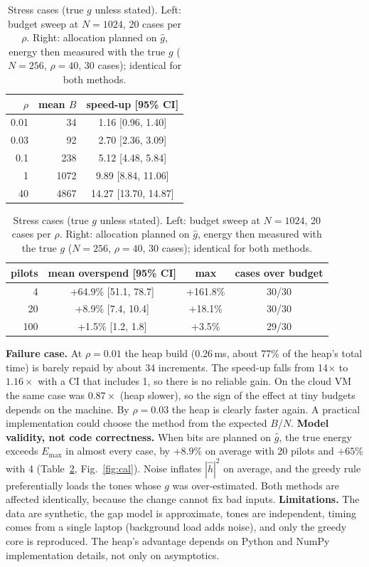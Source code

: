 \documentclass[10pt,a4paper]{article}
\begin{document}
\begin{table}[h]\centering\small
\caption{Stress cases (true $g$ unless stated). Left: budget sweep at $N=1024$, 20 cases per $\rho$. Right: allocation planned on
$\hat g$, energy then measured with the true $g$ ($N=256$, $\rho=40$, 30 cases); identical for both methods.}
\label{tab:stress}\vspace{-4pt}
\begin{tabular}{rrc}\toprule
$\rho$ & mean $B$ & speed-up [95\% CI]\\\midrule
0.01 & 34   & 1.16 [0.96, 1.40]\\
0.03 & 92   & 2.70 [2.36, 3.09]\\
0.1  & 238  & 5.12 [4.48, 5.84]\\
1    & 1072 & 9.89 [8.84, 11.06]\\
40   & 4867 & 14.27 [13.70, 14.87]\\\bottomrule
\end{tabular}\qquad
\begin{tabular}{rccc}\toprule
pilots & mean overspend [95\% CI] & max & cases over budget\\\midrule
4   & +64.9\% [51.1, 78.7] & +161.8\% & 30/30\\
20  & +8.9\% [7.4, 10.4]   & +18.1\%  & 30/30\\
100 & +1.5\% [1.2, 1.8]    & +3.5\%   & 29/30\\\bottomrule
\end{tabular}
\end{table}
\vspace{-6pt}

\textbf{Failure case.} At $\rho=0.01$ the heap build (0.26\,ms, about 77\% of the heap's total time) is barely repaid by about
34 increments. The speed-up falls from 14$\times$ to $1.16\times$ with a CI that includes 1, so there is no reliable gain.
On the cloud VM the same case was $0.87\times$ (heap slower), so the sign of the effect at tiny budgets depends on the machine.
By $\rho=0.03$ the heap is clearly faster again. A practical implementation could choose the method from the expected $B/N$.
\textbf{Model validity, not code correctness.} When bits are planned on $\hat g$, the true energy exceeds $E_{\max}$ in almost every
case, by $+8.9\%$ on average with 20 pilots and $+65\%$ with 4 (Table~\ref{tab:stress}, Fig.~\ref{fig:cal}). Noise inflates
$|\hat h|^2$ on average, and the greedy rule preferentially loads the tones whose $g$ was over-estimated. Both methods are affected
identically, because the change cannot fix bad inputs.
\textbf{Limitations.} The data are synthetic, the gap model is approximate, tones are independent, timing comes from a single
laptop (background load adds noise), and only the greedy core is reproduced. The heap's advantage depends on Python and NumPy
implementation details, not only on asymptotics.
\end{document}
